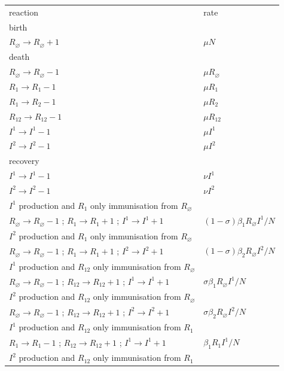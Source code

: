 \begin{table}[!h]
\center
	\begin{tabular}{ll}
		reaction & rate \\
		birth\\
		$R_\varnothing \rightarrow R_\varnothing +1$ & $\mu N$ \\
		death\\
		$R_\varnothing \rightarrow R_\varnothing -1$ & $\mu R_\varnothing$ \\
		$R_1 \rightarrow R_1-1$ & $\mu R_1$ \\
		$R_1 \rightarrow R_2-1$ & $\mu R_2$ \\
		$R_{12} \rightarrow R_{12}-1$ & $\mu R_{12}$ \\
		$I^1 \rightarrow I^1-1$ & $\mu I^1$ \\
		$I^2 \rightarrow I^2-1$ & $\mu I^2$ \\
		recovery \\
		$I^1 \rightarrow I^1-1$ & $\nu I^1$ \\
		$I^2 \rightarrow I^2-1$ & $\nu I^2$ \\
		$I^1$ production and $R_1$ only immunisation from $R_\varnothing$ \\
		$R_\varnothing \rightarrow R_\varnothing-1$ ; $R_1 \rightarrow R_1+1$ ; $I^1 \rightarrow I^1+1$ & $(1-\sigma) \beta_1 R_\varnothing I^1/N$ \\
		$I^2$ production and $R_1$ only immunisation from $R_\varnothing$ \\
		$R_\varnothing \rightarrow R_\varnothing-1$ ; $R_1 \rightarrow R_1+1$ ; $I^2 \rightarrow I^2+1$ & $(1-\sigma) \beta_2 R_\varnothing I^2/N$ \\
		$I^1$ production and $R_{12}$ only immunisation from $R_\varnothing$ \\
		$R_\varnothing \rightarrow R_\varnothing-1$ ; $R_{12} \rightarrow R_{12}+1$ ; $I^1 \rightarrow I^1+1$ & $\sigma \beta_1 R_\varnothing I^1/N$ \\
		$I^2$ production and $R_{12}$ only immunisation from $R_\varnothing$ \\
		$R_\varnothing \rightarrow R_\varnothing-1$ ; $R_{12} \rightarrow R_{12}+1$ ; $I^2 \rightarrow I^2+1$ & $\sigma \beta_2 R_\varnothing I^2/N$ \\
		$I^1$ production and $R_{12}$ only immunisation from $R_1$ \\
		$R_1 \rightarrow R_1-1$ ; $R_{12} \rightarrow R_{12}+1$ ; $I^1 \rightarrow I^1+1$ &  $\beta_1 R_1 I^1/N$ \\
		$I^2$ production and $R_{12}$ only immunisation from $R_1$ \\

\end{tabular}
\end{table}
